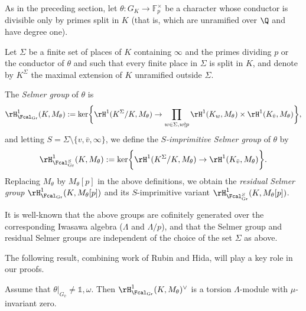 As in the preceding section, let $\theta:G_K\rightarrow\mathbb{F}_p^\times$ be a character whose conductor is divisible only by primes split in $K$ (that is, which are unramified over $\Q$ and have degree one).

Let $\Sigma$ be a finite set of places of $K$ containing $\infty$ and the primes dividing $p$ or the conductor of $\theta$
and such that every finite place in $\Sigma$ is split in $K$, and denote by $K^\Sigma$ the maximal extension of $K$ unramified outside $\Sigma$.

\begin{definition}
\notready
The \emph{Selmer group} of $\theta$ is
\[
\rH^1_{\Fcal_{\rm Gr}}(K,M_\theta):=\ker\biggr\{\rH^1(K^\Sigma/K,M_\theta)\rightarrow\prod_{w \in \Sigma, w \nmid p}\rH^1(K_w,M_\theta)\times\rH^1(K_{\bar{v}},M_\theta)\biggr\},
\]
and letting $S=\Sigma\setminus\{v,\bar{v},\infty\}$, we define the \emph{$S$-imprimitive Selmer group} of $\theta$ by
\[
\rH^1_{\Fcal_{\rm Gr}^S}(K,M_\theta):=\ker\biggr\{\rH^1(K^\Sigma/K,M_\theta)\rightarrow\rH^1(K_{\bar{v}},M_\theta)\biggr\}.
\]
Replacing $M_\theta$ by $M_\theta[p]$ in the above definitions, we obtain the \emph{residual Selmer group} $\rH^1_{\Fcal_{\rm Gr}}(K,M_\theta[p])$ and its $S$-imprimitive variant $\rH^1_{\Fcal_{\rm Gr}^S}(K,M_\theta[p])$.
\end{definition}

It is well-known that the above  groups are cofinitely generated over the corresponding Iwasawa algebra ($\Lambda$ and $\Lambda/p$), and that the Selmer group and residual Selmer groups
are independent of the choice of the set $\Sigma$ as above.


The following result, combining work of Rubin
and Hida, will play a key role in our proofs.

\begin{theorem}
\notready\label{thmmu=0}
Assume that $\theta\vert_{G_{\bar{v}}}\neq\mathds{1},\omega$. Then $\rH^1_{\Fcal_{\rm Gr}}(K,M_\theta)^\vee$ is a torsion $\Lambda$-module with $\mu$-invariant zero.
\end{theorem}

